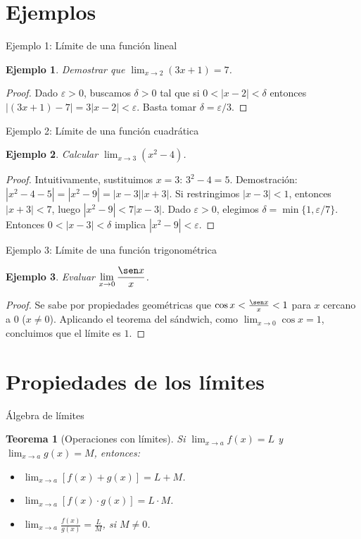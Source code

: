 \documentclass[10pt, spanish]{beamer}
\newtheorem{teorema}{Teorema}
\newtheorem{ejemplo}{Ejemplo}
\begin{document}
	\section{Ejemplos}
	\begin{frame}{Ejemplo 1: Límite de una función lineal}
		\begin{ejemplo}
			Demostrar que $\displaystyle \lim_{x\to 2} (3x+1) = 7$.
		\end{ejemplo}
		\begin{proof}
			Dado $\varepsilon > 0$, buscamos $\delta > 0$ tal que si $0<|x-2|<\delta$ entonces $|(3x+1)-7| = 3|x-2| < \varepsilon$. Basta tomar $\delta = \varepsilon/3$.
		\end{proof}
	\end{frame}
	
	\begin{frame}{Ejemplo 2: Límite de una función cuadrática}
		\begin{ejemplo}
			Calcular $\displaystyle \lim_{x\to 3} (x^2 - 4)$.
		\end{ejemplo}
		\begin{proof}
			Intuitivamente, sustituimos $x=3$: $3^2-4 = 5$. Demostración: $|x^2-4 -5| = |x^2-9| = |x-3||x+3|$. Si restringimos $|x-3|<1$, entonces $|x+3|<7$, luego $|x^2-9| < 7|x-3|$. Dado $\varepsilon>0$, elegimos $\delta = \min\{1, \varepsilon/7\}$. Entonces $0<|x-3|<\delta$ implica $|x^2-9| < \varepsilon$.
		\end{proof}
	\end{frame}
	
	\begin{frame}{Ejemplo 3: Límite de una función trigonométrica}
		\begin{ejemplo}
			Evaluar $\displaystyle \lim_{x\to 0} \frac{\sen x}{x}$.
		\end{ejemplo}
		\begin{proof}
			Se sabe por propiedades geométricas que $\cos x < \frac{\sen x}{x} < 1$ para $x$ cercano a $0$ ($x\neq 0$). Aplicando el teorema del sándwich, como $\lim_{x\to 0} \cos x = 1$, concluimos que el límite es $1$.
		\end{proof}
	\end{frame}
	
	\section{Propiedades de los límites}
	\begin{frame}{Álgebra de límites}
		\begin{teorema}[Operaciones con límites]
			Si $\displaystyle \lim_{x\to a} f(x) = L$ y $\displaystyle \lim_{x\to a} g(x) = M$, entonces:
			\begin{itemize}
				\item $\displaystyle \lim_{x\to a} [f(x) + g(x)] = L + M$.
				\item $\displaystyle \lim_{x\to a} [f(x) \cdot g(x)] = L \cdot M$.
				\item $\displaystyle \lim_{x\to a} \frac{f(x)}{g(x)} = \frac{L}{M}$, si $M \neq 0$.
			\end{itemize}
		\end{teorema}
	\end{frame}
	
\end{document}
